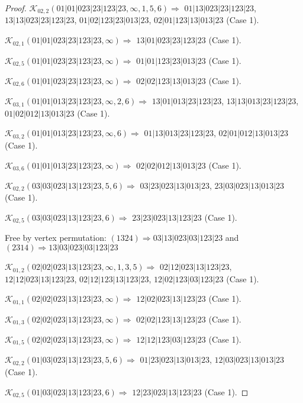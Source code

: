 \documentclass[12pt]{article}
\theoremstyle{plain}
\theoremstyle{definition}
\theoremstyle{remark}
\newcommand{\fancy}[1]{\mathcal{#1}}
\def\K{\fancy{K}}
\begin{document}
\begin{proof}
	\bigskip
	
	$\K_{02,2}(01|01|023|23|123|23,\infty,1, 5, 6)\Rightarrow $ $01|13|023|23|123|23$, $13|13|023|23|123|23$, $01|02|123|23|013|23$, $02|01|123|13|013|23$ (Case 1).
	
	$\K_{02,1}(01|01|023|23|123|23,\infty)\Rightarrow $ $13|01|023|23|123|23$ (Case 1).
	
	$\K_{02,5}(01|01|023|23|123|23,\infty)\Rightarrow $ $01|01|123|23|013|23$ (Case 1).
	
	$\K_{02,6}(01|01|023|23|123|23,\infty)\Rightarrow $ $02|02|123|13|013|23$ (Case 1).
	
	
	\bigskip
	
	$\K_{03,1}(01|01|013|23|123|23,\infty,2, 6)\Rightarrow $ $13|01|013|23|123|23$, $13|13|013|23|123|23$, $01|02|012|13|013|23$ (Case 1).
	
	$\K_{03,2}(01|01|013|23|123|23,\infty,6)\Rightarrow $ $01|13|013|23|123|23$, $02|01|012|13|013|23$ (Case 1).
	
	$\K_{03,6}(01|01|013|23|123|23,\infty)\Rightarrow $ $02|02|012|13|013|23$ (Case 1).
	
	
	\bigskip
	
	$\K_{02,2}(03|03|023|13|123|23,5, 6)\Rightarrow $ $03|23|023|13|013|23$, $23|03|023|13|013|23$ (Case 1).
	
	$\K_{02,5}(03|03|023|13|123|23,6)\Rightarrow $ $23|23|023|13|123|23$ (Case 1).
	
	
	
	Free by vertex permutation: $(1 3 2 4)\Rightarrow 03|13|023|03|123|23$ and $(2 3 1 4)\Rightarrow 13|03|023|03|123|23$
	
	
	
	\bigskip
	
	$\K_{01,2}(02|02|023|13|123|23,\infty,1, 3, 5)\Rightarrow $ $02|12|023|13|123|23$, $12|12|023|13|123|23$, $02|12|123|13|123|23$, $12|02|123|03|123|23$ (Case 1).
	
	$\K_{01,1}(02|02|023|13|123|23,\infty)\Rightarrow $ $12|02|023|13|123|23$ (Case 1).
	
	$\K_{01,3}(02|02|023|13|123|23,\infty)\Rightarrow $ $02|02|123|13|123|23$ (Case 1).
	
	$\K_{01,5}(02|02|023|13|123|23,\infty)\Rightarrow $ $12|12|123|03|123|23$ (Case 1).
	
	
	\bigskip
	
	$\K_{02,2}(01|03|023|13|123|23,5, 6)\Rightarrow $ $01|23|023|13|013|23$, $12|03|023|13|013|23$ (Case 1).
	
	$\K_{02,5}(01|03|023|13|123|23,6)\Rightarrow $ $12|23|023|13|123|23$ (Case 1).
	

\end{proof}
\end{document}
